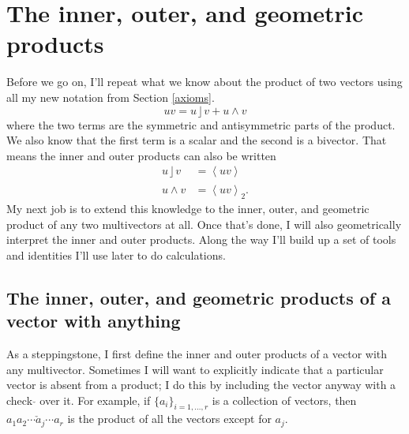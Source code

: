 \documentclass{utarticle}
\DeclareMathOperator{\lin}{\rfloor}
\DeclareMathOperator{\out}{\wedge}
\newcommand{\grade}[2][]{\ensuremath{\left\langle #2 \right\rangle_{#1}}}
\begin{document}
\section{The inner, outer, and geometric products}
\label{productprops}

Before we go on, I'll repeat what we know about the product of two vectors using 
all my new notation from Section \ref{axioms}.
\begin{equation}
uv = u \lin v + u \out v \label{prodsum} \end{equation}
where the two terms are the symmetric and antisymmetric parts of the product.
We also know that the first term is a scalar and the second is a bivector.
That means the inner and outer products can also be written
\begin{align}
u \lin v & = \grade{uv} \nonumber \\
u \out v & = \grade[2]{uv}. \label{vecdecomp}
\end{align}
My next job is to extend this knowledge to the inner, outer, and geometric product 
of any two multivectors at all. Once that's done, I will also 
geometrically interpret the inner and outer products.  Along the way I'll build up a 
set of tools and identities I'll use later to do calculations.

\subsection{The inner, outer, and geometric products of a vector with anything}

As a steppingstone, I first define the inner and outer products of a vector with any
multivector.  Sometimes I will want to explicitly indicate that a particular vector is absent 
from a product; I do this by including the vector anyway with a check $\check{}$ 
over it.  For example, if $\{a_i\}_{i=1,\dotsc,r}$ is a collection of vectors, 
then $a_1 a_2 \dotsb \check{a}_j \dotsb a_r$ is the product of all the 
vectors except for $a_j$.
\end{document}
